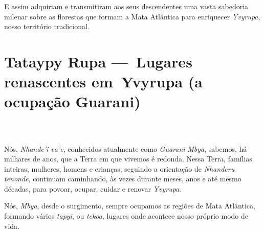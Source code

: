 E assim adquiriam e transmitiram aos seus descendentes uma vasta
sabedoria milenar sobre as florestas que formam a Mata Atlântica para
enriquecer \emph{Yvyrupa}, nosso território tradicional.




 
\ifodd\thepage\relax\else\paginabranca\fi
\part[Lugares renascentes em Yvyrupa]{Tataypy Rupa — Lugares renascentes em Yvyrupa (a ocupação Guarani)}
\chapter*{}  

Nós, \emph{Nhande'i va'e}, conhecidos atualmente como \emph{Guarani}
\emph{Mbya}, sabemos, há milhares de anos, que a Terra em que vivemos é
redonda. Nessa Terra, famílias inteiras, mulheres, homens e crianças,
seguindo a orientação de \emph{Nhanderu tenonde}, continuam caminhando,
às vezes durante meses, anos e até mesmo décadas, para povoar, ocupar,
cuidar e renovar \emph{Yvyrupa}.

Nós, \emph{Mbya}, desde o surgimento, sempre ocupamos as regiões de Mata
Atlântica, formando vários \emph{tapyi}, ou \emph{tekoa}, lugares onde
acontece nosso próprio modo de vida.

 
